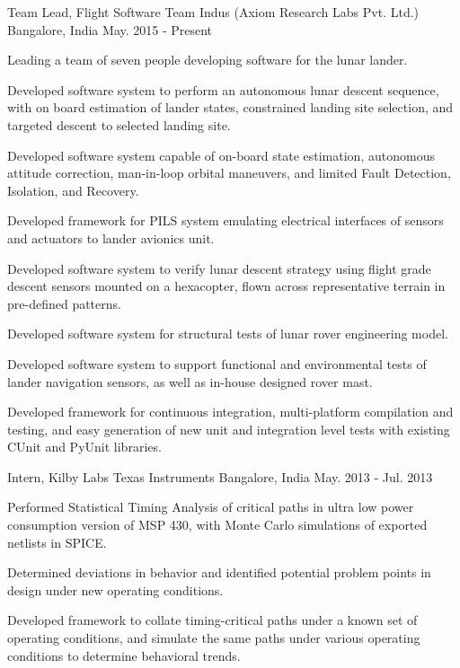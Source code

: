 \begin{cventries}
	\cventry
	{Team Lead, Flight Software}
	{Team Indus (Axiom Research Labs Pvt. Ltd.)}
	{Bangalore, India}
	{May. 2015 - Present}
	{
		\begin{cvitems}
			\item{Leading a team of seven people developing software for the lunar lander.}
			\item{Developed software system to perform an autonomous lunar descent sequence, with on board estimation of lander states, constrained landing site selection, and targeted descent to selected landing site.}
			\item{Developed software system capable of on-board state estimation, autonomous attitude correction, man-in-loop orbital maneuvers, and limited Fault Detection, Isolation, and Recovery.}
			\item{Developed framework for PILS system emulating electrical interfaces of sensors and actuators to lander avionics unit.}
			\item{Developed software system to verify lunar descent strategy using flight grade descent sensors mounted on a hexacopter, flown across representative terrain in pre-defined patterns.}
			\item{Developed software system for structural tests of lunar rover engineering model.}
			\item{Developed software system to support functional and environmental tests of lander navigation sensors, as well as in-house designed rover mast.}
			\item{Developed framework for continuous integration, multi-platform compilation and testing, and easy generation of new unit and integration level tests with existing CUnit and PyUnit libraries.}
		\end{cvitems}
	}

	\cventry
	{Intern, Kilby Labs}
	{Texas Instruments}
	{Bangalore, India}
	{May. 2013 - Jul. 2013}
	{
		\begin{cvitems}
		\item{Performed Statistical Timing Analysis of critical paths in ultra low power consumption version of MSP 430, with Monte Carlo simulations of exported netlists in SPICE.}
		\item{Determined deviations in behavior and identified potential problem points in design under new operating conditions.}
		\item{Developed framework to collate timing-critical paths under a known set of operating conditions, and simulate the same paths under various operating conditions to determine behavioral trends.}
		\end{cvitems}
	}


\end{cventries}
